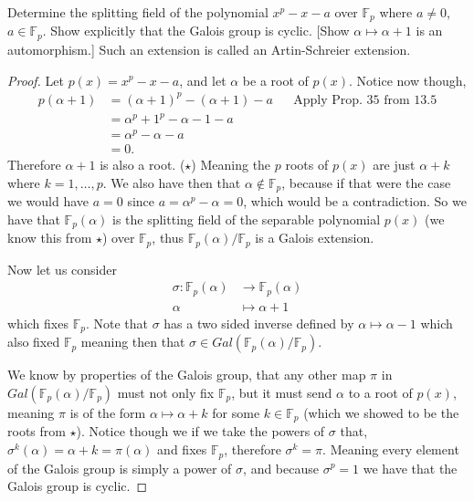 \documentclass[11pt]{article}
\newenvironment{problem}[2][Problem\!]{\begin{tcolorbox}\begin{trivlist}
\item[\hskip \labelsep {\bfseries #1}\hskip \labelsep {\bfseries #2}]}{\end{trivlist}\end{tcolorbox}}
\newcommand{\ff}{\mathbb F}   %
\begin{document}
\vspace*{15pt}

\begin{problem}{14.3.8}
    Determine the splitting field of the polynomial $x^{p} - x -a$ over $\ff_p$ where $a\neq 0 $, $a\in \ff_p$. Show explicitly that the Galois group is cyclic. [Show $\alpha \mapsto \alpha +1$ is an automorphism.] Such an extension is called an Artin-Schreier extension. 
\end{problem}
\begin{proof}
    Let $p(x) = x^{p} - x -a$, and let $\alpha$ be a root of $p(x)$. Notice now though,
    \begin{align*}
        p(\alpha + 1) &= (\alpha + 1)^{p} - (\alpha + 1) - a && \text{Apply Prop. 35 from 13.5} \\
        &=\alpha^{p } + 1^{p} - \alpha -1 -a  \\
        &= \alpha^{p} -\alpha - a \\
        &= 0.
    \end{align*}
    Therefore $\alpha +1$ is also a root. ($\star$) Meaning the $p$ roots of $p(x)$ are just $\alpha + k$ where $k = 1, \dots , p$. We also have then that $\alpha \notin \ff_p$, because if that were the case we would have $a= 0$ since $a = \alpha^{p} -\alpha = 0$, which would be a contradiction. So we have that $\ff_p(\alpha)$ is the splitting field of the separable polynomial $p(x)$ (we know this from $\star$) over $\ff_p$, thus $\ff_p(\alpha)/\ff_p$ is a Galois extension. 

    Now let us consider
    \begin{align*}
        \sigma: \ff_p(\alpha) &\to \ff_p(\alpha) \\
        \alpha &\mapsto \alpha + 1
    \end{align*}
    which fixes $\ff_p$. Note that $\sigma$ has a two sided inverse defined by $\alpha \mapsto \alpha - 1$ which also fixed $\ff_p$ meaning then that $\sigma\in Gal(\ff_p(\alpha)/\ff_p)$. 

    We know by properties of the Galois group, that any other map $\pi$ in \\$ Gal(\ff_p(\alpha)/ \ff_p)$ must not only fix $\ff_p$, but it must send $\alpha$ to a root of $p(x)$, meaning $\pi$ is of the form $\alpha \mapsto \alpha +k$ for some $k \in \ff_p$ (which we showed to be the roots from $\star$). Notice though we if we take the powers of $\sigma$ that, $\sigma^{k}(\alpha) = \alpha + k = \pi(\alpha)$ and fixes $\ff_p$, therefore $\sigma^{k} = \pi$. Meaning every element of the Galois group is simply a power of $\sigma$, and because $\sigma^{p} = 1$ we have that the Galois group is cyclic.  

\end{proof}
\end{document}
